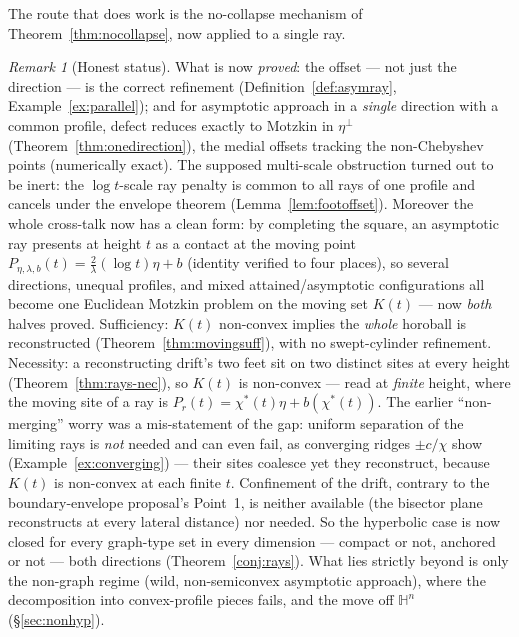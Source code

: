 \documentclass[11pt]{article}
\theoremstyle{remark}
\newtheorem{remark}[theorem]{Remark}
\begin{document}
The route that does work is the no-collapse mechanism of
Theorem~\ref{thm:nocollapse}, now applied to a single ray.

\begin{remark}[Honest status]\label{rem:noncompact3}
What is now \emph{proved}: the offset --- not just the direction --- is
the correct refinement (Definition~\ref{def:asymray},
Example~\ref{ex:parallel}); and for asymptotic approach in a
\emph{single} direction with a common profile, defect reduces exactly
to Motzkin in $\eta^{\perp}$ (Theorem~\ref{thm:onedirection}), the
medial offsets tracking the non-Chebyshev points (numerically exact).
The supposed multi-scale obstruction turned out to be inert: the
$\log t$-scale ray penalty is common to all rays of one profile and
cancels under the envelope theorem (Lemma~\ref{lem:footoffset}).
Moreover the whole cross-talk now has a clean form: by completing the
square, an asymptotic ray presents at height $t$ as a contact at the
moving point $P_{\eta,\lambda,b}(t)=\frac{2}{\lambda}(\log t)\eta+b$
(identity verified to four places), so several directions, unequal
profiles, and mixed attained/asymptotic configurations all become one
Euclidean Motzkin problem on the moving set $K(t)$ --- now \emph{both}
halves proved. Sufficiency: $K(t)$ non-convex implies the \emph{whole}
horoball is reconstructed (Theorem~\ref{thm:movingsuff}), with no
swept-cylinder refinement. Necessity: a reconstructing drift's two feet
sit on two distinct sites at every height (Theorem~\ref{thm:rays-nec}),
so $K(t)$ is non-convex --- read at \emph{finite} height, where the
moving site of a ray is $P_{r}(t)=\chi^{\ast}(t)\eta+b(\chi^{\ast}(t))$.
The earlier ``non-merging'' worry was a mis-statement of the gap:
uniform separation of the limiting rays is \emph{not} needed and can
even fail, as converging ridges $\pm c/\chi$ show
(Example~\ref{ex:converging}) --- their sites coalesce yet they
reconstruct, because $K(t)$ is non-convex at each finite $t$.
Confinement of the drift, contrary to the boundary-envelope proposal's
Point~1, is neither available (the bisector plane reconstructs at every
lateral distance) nor needed. So the hyperbolic case is now closed for
every graph-type set in every dimension --- compact or not, anchored or
not --- both directions (Theorem~\ref{conj:rays}). What lies strictly
beyond is only the non-graph regime (wild, non-semiconvex asymptotic
approach), where the decomposition into convex-profile pieces fails, and
the move off $\mathbb{H}^{n}$ (\S\ref{sec:nonhyp}).
\end{remark}
\end{document}
